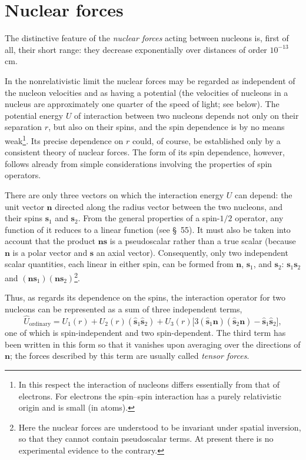 \section{Nuclear forces}

The distinctive feature of the \emph{nuclear forces} acting between nucleons
is, first of all, their short range: they decrease exponentially over
distances of order $10^{-13}$ cm.

In the nonrelativistic limit the nuclear forces may be regarded as independent
of the nucleon velocities and as having a potential (the velocities of
nucleons in a nucleus are approximately one quarter of the speed of light;
see below). The potential energy $U$ of interaction between two nucleons
depends not only on their separation $r$, but also on their spins, and the spin
dependence is by no means weak\footnote{In this respect the interaction of
nucleons differs essentially from that of electrons. For electrons the
spin--spin interaction has a purely relativistic origin and is small (in
atoms).}. Its precise dependence on $r$ could, of course, be established only
by a consistent theory of nuclear forces. The form of its spin dependence,
however, follows already from simple considerations involving the properties
of spin operators.

There are only three vectors on which the interaction energy $U$ can depend:
the unit vector $\mathbf n$ directed along the radius vector between the two
nucleons, and their spins $\mathbf s_1$ and $\mathbf s_2$. From the general
properties of a spin-$1/2$ operator, any function of it reduces to a linear
function (see §~55). It must also be taken into account that the product
$\mathbf n\mathbf s$ is a pseudoscalar rather than a true scalar (because
$\mathbf n$ is a polar vector and $\mathbf s$ an axial vector). Consequently,
only two independent scalar quantities, each linear in either spin, can be
formed from $\mathbf n$, $\mathbf s_1$, and $\mathbf s_2$:
$\mathbf s_1\mathbf s_2$ and
$(\mathbf n\mathbf s_1)(\mathbf n\mathbf s_2)$\footnote{Here the nuclear
forces are understood to be invariant under spatial inversion, so that they
cannot contain pseudoscalar terms. At present there is no experimental
evidence to the contrary.}.

Thus, as regards its dependence on the spins, the interaction operator for two
nucleons can be represented as a sum of three independent terms,
\begin{equation}
 \hat U_{\text{ordinary}}=U_1(r)+U_2(r)(\hat{\mathbf s}_1\hat{\mathbf s}_2)
 +U_3(r)\bigl[3(\hat{\mathbf s}_1\mathbf n)
 (\hat{\mathbf s}_2\mathbf n)-\hat{\mathbf s}_1\hat{\mathbf s}_2\bigr],
 \tag{117.1}
\end{equation}
one of which is spin-independent and two spin-dependent. The third term has
been written in this form so that it vanishes upon averaging over the
directions of $\mathbf n$; the forces described by this term are usually
called \emph{tensor forces}.

